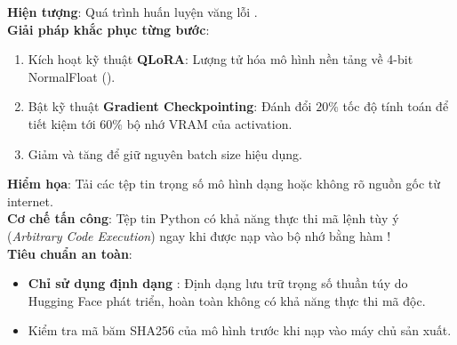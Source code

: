 \begin{debugbox}
\textbf{Hiện tượng}: Quá trình huấn luyện văng lỗi .\\
\textbf{Giải pháp khắc phục từng bước}:
\begin{enumerate}
  \item Kích hoạt kỹ thuật \textbf{QLoRA}: Lượng tử hóa mô hình nền tảng về 4-bit NormalFloat ().
  \item Bật kỹ thuật \textbf{Gradient Checkpointing}: Đánh đổi $20\%$ tốc độ tính toán để tiết kiệm tới $60\%$ bộ nhớ VRAM của activation.
  \item Giảm  và tăng  để giữ nguyên batch size hiệu dụng.
\end{enumerate}
\end{debugbox}

\begin{securitybox}
\textbf{Hiểm họa}: Tải các tệp tin trọng số mô hình dạng  hoặc  không rõ nguồn gốc từ internet.\\
\textbf{Cơ chế tấn công}: Tệp tin Python  có khả năng thực thi mã lệnh tùy ý (\textit{Arbitrary Code Execution}) ngay khi được nạp vào bộ nhớ bằng hàm !\\
\textbf{Tiêu chuẩn an toàn}:
\begin{itemize}
  \item \textbf{Chỉ sử dụng định dạng }: Định dạng lưu trữ trọng số thuần túy do Hugging Face phát triển, hoàn toàn không có khả năng thực thi mã độc.
  \item Kiểm tra mã băm SHA256 của mô hình trước khi nạp vào máy chủ sản xuất.
\end{itemize}
\end{securitybox}

